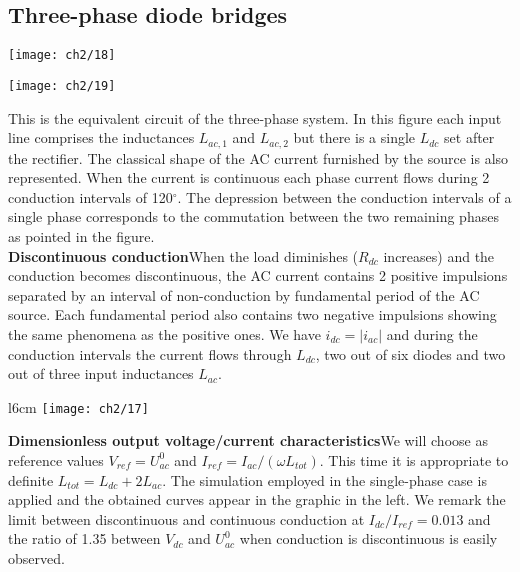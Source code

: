 	\subsection{Three-phase diode bridges}
	
		\begin{center}
		\begin{minipage}{0.45\textwidth}
			\begin{flushleft}
			\texttt{[image: ch2/18]}
			\end{flushleft}
		\end{minipage}			
		\begin{minipage}{0.45\textwidth}
			\begin{flushright}
			\texttt{[image: ch2/19]}
			\end{flushright}
		\end{minipage}			
		\end{center}
		
		This is the equivalent circuit of the three-phase system. In this figure each input line comprises the inductances $L_{ac,1}$ and $L_{ac,2}$ but there is a single $L_{dc}$ set after the rectifier. The classical shape of the AC current furnished by the source is also represented. When the current is continuous each phase current flows during 2 conduction intervals of 120$^\circ$. The depression between the conduction intervals of a single phase corresponds to the commutation between the two remaining phases as pointed in the figure.\\
		
		\textbf{Discontinuous conduction}\qquad When the load diminishes ($R_{dc}$ increases) and the conduction becomes discontinuous, the AC current contains 2 positive impulsions separated by an interval of non-conduction by fundamental period of the AC source. Each fundamental period also contains two negative impulsions showing the same phenomena as the positive ones. We have $i_{dc} = |i_{ac}|$ and during the conduction intervals the current flows through $L_{dc}$, two out of six diodes and two out of three input inductances $L_{ac}$. \\
		
		\begin{wrapfigure}[8]{l}{6cm}
		\vspace{-5mm}
		\texttt{[image: ch2/17]}
		\end{wrapfigure} 
		\textbf{Dimensionless output voltage/current characteristics}\qquad 		 We will choose as reference values $V_{ref} = U_{ac}^0$ and $I_{ref} = I_{ac}/(\omega L_{tot})$. This time it is appropriate to definite $L_{tot} = L_{dc}+ 2L_{ac}$. The simulation employed in the single-phase case is applied and the obtained curves appear in the graphic in the left. We remark the limit between discontinuous and continuous conduction at $I_{dc}/I_{ref} = 0.013$ and the ratio of 1.35 between $V_{dc}$ and $U_{ac}^0$ when conduction is discontinuous is easily observed. 
			